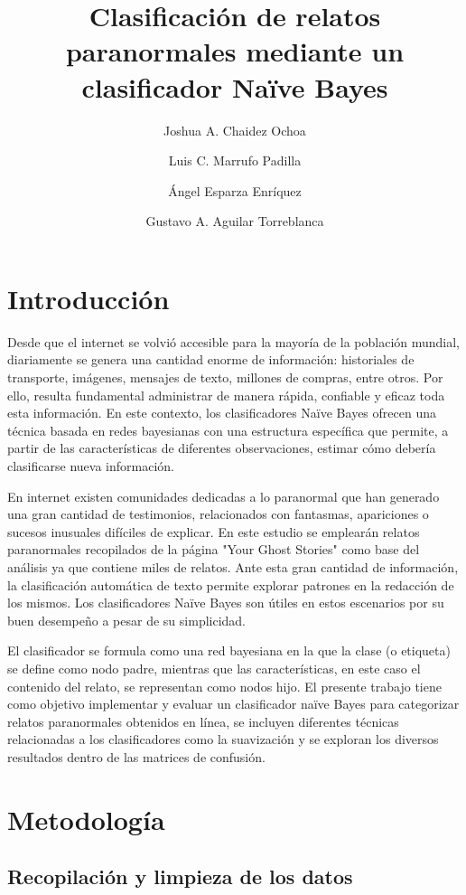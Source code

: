 \documentclass[eng]{ajceam-class}
\title {Clasificación de relatos paranormales mediante un clasificador Naïve Bayes}
\author[1]{Joshua A. Chaidez Ochoa}
\author[1]{Luis C. Marrufo Padilla}
\author[1]{Ángel Esparza Enríquez}
\author[1]{Gustavo A. Aguilar Torreblanca}
\affil[1]{Tecnológico de Monterrey, Escuela de Ingeniería y Ciencias, Guadalajara, Jalisco}
\begin{document}
\maketitle
\thispagestyle{fancy}

\section{Introducción}
Desde que el internet se volvió accesible para la mayoría de la población mundial, diariamente se genera una cantidad enorme de información: historiales de transporte, imágenes, mensajes de texto, millones de compras, entre otros. Por ello, resulta fundamental administrar de manera rápida, confiable y eficaz toda esta información. En este contexto, los clasificadores Naïve Bayes ofrecen una técnica basada en redes bayesianas con una estructura específica que permite, a partir de las características de diferentes observaciones, estimar cómo debería clasificarse nueva información.

En internet existen comunidades dedicadas a lo paranormal que han generado una gran cantidad de testimonios, relacionados con fantasmas, apariciones o sucesos inusuales difíciles de explicar. En este estudio se emplearán relatos paranormales recopilados de la página "Your Ghost Stories" como base del análisis ya que contiene miles de relatos. Ante esta gran cantidad de información, la clasificación automática de texto permite explorar patrones en la redacción de los mismos. Los clasificadores Naïve Bayes son útiles en estos escenarios por su buen desempeño a pesar de su simplicidad.

El clasificador se formula como una red bayesiana en la que la clase (o etiqueta) se define como nodo padre, mientras que las características, en este caso el contenido del relato, se representan como nodos hijo. El presente trabajo tiene como objetivo implementar y evaluar un clasificador naïve Bayes para categorizar relatos paranormales obtenidos en línea, se incluyen diferentes técnicas relacionadas a los clasificadores como la suavización y se exploran los diversos resultados dentro de las matrices de confusión.

\section{Metodología}

\subsection{Recopilación y limpieza de los datos}
\end{document}
